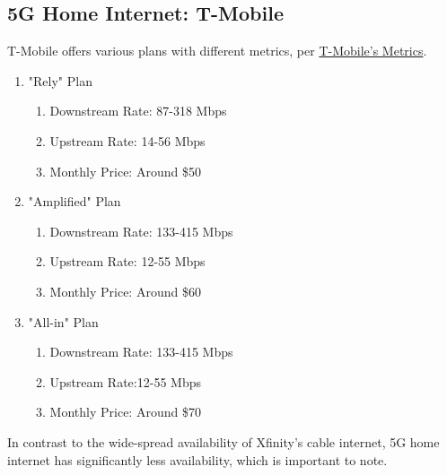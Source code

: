 \documentclass{article}
\begin{document}
\subsection{5G Home Internet: T-Mobile}
T-Mobile offers various plans with different metrics, per \href{https://www.t-mobile.com/home-internet/policies/internet-service/network-speed-performance-metricsper}{T-Mobile's Metrics}.
\begin{enumerate}
    \item "Rely" Plan \begin{enumerate}
        \item Downstream Rate: 87-318 Mbps
        \item Upstream Rate: 14-56 Mbps
        \item Monthly Price: Around \$50
    \end{enumerate}
    \item "Amplified" Plan  \begin{enumerate}
        \item Downstream Rate: 133-415 Mbps
        \item Upstream Rate: 12-55 Mbps
        \item Monthly Price: Around \$60
    \end{enumerate}
    \item "All-in" Plan \begin{enumerate}
        \item Downstream Rate: 133-415 Mbps
        \item Upstream Rate:12-55 Mbps
        \item Monthly Price: Around \$70
    \end{enumerate}
\end{enumerate}
In contrast to the wide-spread availability of Xfinity's cable internet, 5G home internet has significantly less availability, which is important to note.
\end{document}
